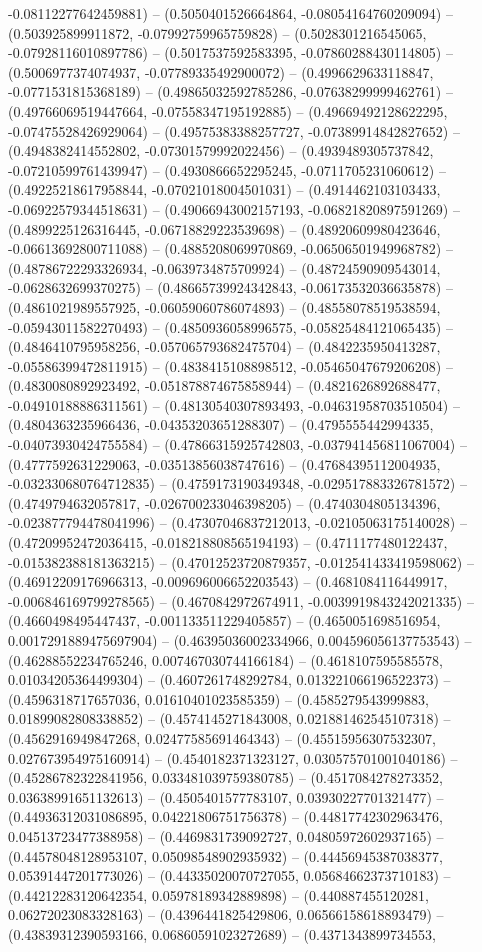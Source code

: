 -0.08112277642459881) -- (0.5050401526664864, -0.08054164760209094) -- (0.503925899911872, -0.07992759965759828) -- (0.5028301216545065, -0.07928116010897786) -- (0.5017537592583395, -0.07860288430114805) -- (0.5006977374074937, -0.07789335492900072) -- (0.4996629633118847, -0.0771531815368189) -- (0.49865032592785286, -0.07638299999462761) -- (0.49766069519447664, -0.07558347195192885) -- (0.49669492128622295, -0.07475528426929064) -- (0.49575383388257727, -0.07389914842827652) -- (0.4948382414552802, -0.07301579992022456) -- (0.4939489305737842, -0.07210599761439947) -- (0.4930866652295245, -0.0711705231060612) -- (0.49225218617958844, -0.07021018004501031) -- (0.4914462103103433, -0.06922579344518631) -- (0.49066943002157193, -0.06821820897591269) -- (0.4899225126316445, -0.06718829223539698) -- (0.48920609980423646, -0.06613692800711088) -- (0.4885208069970869, -0.06506501949968782) -- (0.48786722293326934, -0.0639734875709924) -- (0.48724590909543014, -0.0628632699370275) -- (0.48665739924342843, -0.06173532036635878) -- (0.4861021989557925, -0.06059060786074893) -- (0.48558078519538594, -0.05943011582270493) -- (0.4850936058996575, -0.05825484121065435) -- (0.4846410795958256, -0.057065793682475704) -- (0.4842235950413287, -0.05586399472811915) -- (0.4838415108898512, -0.05465047679206208) -- (0.4830080892923492, -0.051878874675858944) -- (0.4821626892688477, -0.04910188886311561) -- (0.48130540307893493, -0.04631958703510504) -- (0.4804363235966436, -0.04353203651288307) -- (0.4795555442994335, -0.04073930424755584) -- (0.47866315925742803, -0.037941456811067004) -- (0.4777592631229063, -0.03513856038747616) -- (0.47684395112004935, -0.032330680764712835) -- (0.4759173190349348, -0.029517883326781572) -- (0.4749794632057817, -0.026700233046398205) -- (0.4740304805134396, -0.023877794478041996) -- (0.47307046837212013, -0.02105063175140028) -- (0.47209952472036415, -0.018218808565194193) -- (0.4711177480122437, -0.015382388181363215) -- (0.47012523720879357, -0.012541433419598062) -- (0.46912209176966313, -0.009696006652203543) -- (0.4681084116449917, -0.006846169799278565) -- (0.4670842972674911, -0.0039919843242021335) -- (0.4660498495447437, -0.001133511229405857) -- (0.4650051698516954, 0.0017291889475697904) -- (0.46395036002334966, 0.004596056137753543) -- (0.46288552234765246, 0.007467030744166184) -- (0.4618107595585578, 0.01034205364499304) -- (0.4607261748292784, 0.013221066196522373) -- (0.4596318717657036, 0.01610401023585359) -- (0.4585279543999883, 0.01899082808338852) -- (0.4574145271843008, 0.021881462545107318) -- (0.4562916949847268, 0.02477585691464343) -- (0.45515956307532307, 0.027673954975160914) -- (0.4540182371323127, 0.030575701001040186) -- (0.45286782322841956, 0.033481039759380785) -- (0.4517084278273352, 0.03638991651132613) -- (0.4505401577783107, 0.03930227701321477) -- (0.44936312031086895, 0.04221806751756378) -- (0.44817742302963476, 0.04513723477388958) -- (0.4469831739092727, 0.04805972602937165) -- (0.44578048128953107, 0.05098548902935932) -- (0.44456945387038377, 0.05391447201773026) -- (0.44335020070727055, 0.05684662373710183) -- (0.44212283120642354, 0.05978189342889898) -- (0.440887455120281, 0.06272023083328163) -- (0.4396441825429806, 0.06566158618893479) -- (0.43839312390593166, 0.06860591023272689) -- (0.4371343899734553, 
